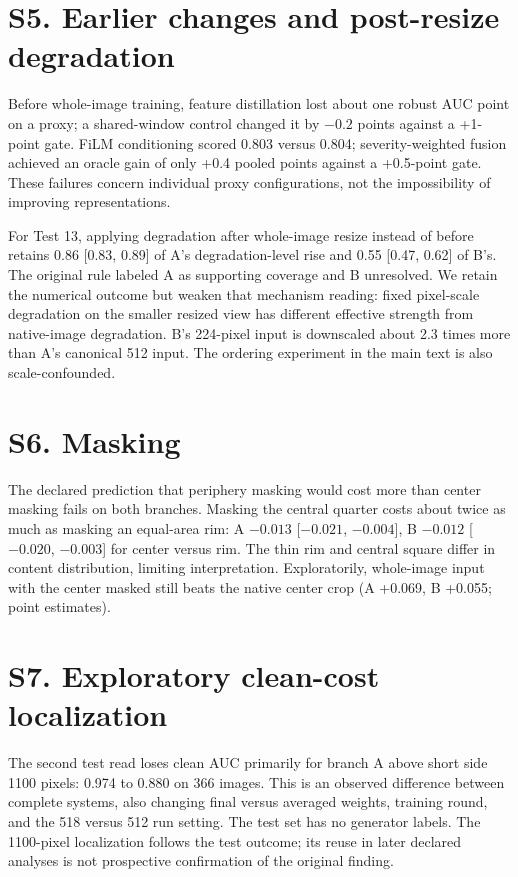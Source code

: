 \documentclass[letterpaper]{article}
\begin{document}
\section{S5. Earlier changes and post-resize degradation}

Before whole-image training, feature distillation lost about one robust AUC point on a proxy; a shared-window control changed it by $-0.2$ points against a +1-point gate. FiLM conditioning scored 0.803 versus 0.804; severity-weighted fusion achieved an oracle gain of only +0.4 pooled points against a +0.5-point gate. These failures concern individual proxy configurations, not the impossibility of improving representations.

For Test 13, applying degradation after whole-image resize instead of before retains 0.86 [0.83, 0.89] of A's degradation-level rise and 0.55 [0.47, 0.62] of B's. The original rule labeled A as supporting coverage and B unresolved. We retain the numerical outcome but weaken that mechanism reading: fixed pixel-scale degradation on the smaller resized view has different effective strength from native-image degradation. B's 224-pixel input is downscaled about 2.3 times more than A's canonical 512 input. The ordering experiment in the main text is also scale-confounded.

\section{S6. Masking}

The declared prediction that periphery masking would cost more than center masking fails on both branches. Masking the central quarter costs about twice as much as masking an equal-area rim: A $-0.013$ [$-0.021$, $-0.004$], B $-0.012$ [$-0.020$, $-0.003$] for center versus rim. The thin rim and central square differ in content distribution, limiting interpretation. Exploratorily, whole-image input with the center masked still beats the native center crop (A +0.069, B +0.055; point estimates).

\section{S7. Exploratory clean-cost localization}

The second test read loses clean AUC primarily for branch A above short side 1100 pixels: 0.974 to 0.880 on 366 images. This is an observed difference between complete systems, also changing final versus averaged weights, training round, and the 518 versus 512 run setting. The test set has no generator labels. The 1100-pixel localization follows the test outcome; its reuse in later declared analyses is not prospective confirmation of the original finding.
\end{document}
